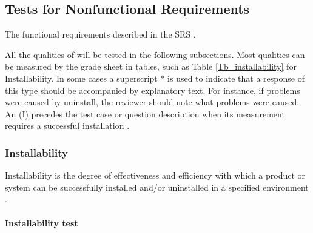 \documentclass[12pt, titlepage]{article}
\begin{document}
\subsection{Tests for Nonfunctional Requirements} \label{sec_nonfuncreqtest}

The functional requirements described in the SRS \cite{Dong2019SRS}.


All the qualities of \progname{} will be tested in the following 
subsections. Most qualities can be measured by the grade sheet in tables, such
as Table \ref{Tb_installability} for Installability. In some cases a superscript $*$
is used to indicate that a response of this type should be accompanied by
explanatory text. For instance, if problems were caused by uninstall, the
reviewer should note what problems were caused. An (I) precedes the test case
or question description when its measurement requires a successful installation
\cite{SmithEtAl2018}.

\subsubsection{Installability}
\label{sec_installtest} Installability is the degree of effectiveness and
efficiency with which a product or system can be successfully installed and/or
uninstalled in a specified environment \cite{ISO/IEC25010:2011}.
	
\paragraph{Installability test}
\end{document}
